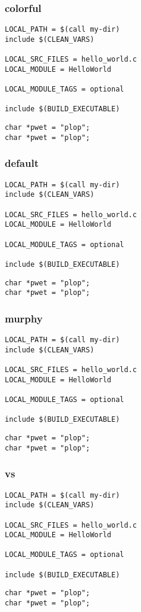 \begin{frame}[fragile]
\frametitle{colorful}
\begin{verbatim}
LOCAL_PATH = $(call my-dir)
include $(CLEAN_VARS)

LOCAL_SRC_FILES = hello_world.c
LOCAL_MODULE = HelloWorld

LOCAL_MODULE_TAGS = optional

include $(BUILD_EXECUTABLE)
\end{verbatim}
\begin{verbatim}
char *pwet = "plop";
char *pwet = "plop";
\end{verbatim}
\end{frame}

\begin{frame}[fragile]
\frametitle{default}
\begin{verbatim}
LOCAL_PATH = $(call my-dir)
include $(CLEAN_VARS)

LOCAL_SRC_FILES = hello_world.c
LOCAL_MODULE = HelloWorld

LOCAL_MODULE_TAGS = optional

include $(BUILD_EXECUTABLE)
\end{verbatim}
\begin{verbatim}
char *pwet = "plop";
char *pwet = "plop";
\end{verbatim}
\end{frame}

\begin{frame}[fragile]
\frametitle{murphy}
\begin{verbatim}
LOCAL_PATH = $(call my-dir)
include $(CLEAN_VARS)

LOCAL_SRC_FILES = hello_world.c
LOCAL_MODULE = HelloWorld

LOCAL_MODULE_TAGS = optional

include $(BUILD_EXECUTABLE)
\end{verbatim}
\begin{verbatim}
char *pwet = "plop";
char *pwet = "plop";
\end{verbatim}
\end{frame}

\begin{frame}[fragile]
\frametitle{vs}
\begin{verbatim}
LOCAL_PATH = $(call my-dir)
include $(CLEAN_VARS)

LOCAL_SRC_FILES = hello_world.c
LOCAL_MODULE = HelloWorld

LOCAL_MODULE_TAGS = optional

include $(BUILD_EXECUTABLE)
\end{verbatim}
\begin{verbatim}
char *pwet = "plop";
char *pwet = "plop";
\end{verbatim}
\end{frame}

